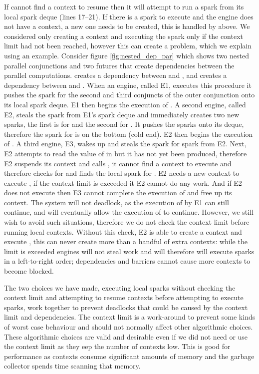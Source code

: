 If \idle cannot find a context to resume then it
will attempt to run a spark from its local spark deque (lines 17--21).
If there is a spark to execute and the engine does not have a context,
a new one needs to be created,
this is handled by \prepareengineforspark above.
We considered only creating a context and executing the spark only if the
context limit had not been reached,
however this can create a problem, which we explain using an example.
Consider figure \ref{fig:nested_dep_par} which shows two nested
parallel conjunctions
and
two futures that create dependencies between the parallel
computations.
 creates a dependency between  and ,
and  creates a dependency between  and .
When an engine, called E1,
executes this procedure it pushes the spark for the second and third
conjuncts of the outer conjunction onto its local spark deque.
E1 then begins the execution of .
A second engine, called E2,
steals the spark from E1's spark deque and immediately creates two new
sparks, the first is for  and the second for .
It pushes the sparks onto its deque,
therefore the spark for  is on the bottom (cold end).
E2 then begins the execution of .
A third engine, E3,
wakes up and steals the spark for  spark from E2.
Next,
E2 attempts to read the value of  in  but it has not yet
been produced,
therefore E2 suspends its context and calls \idle, it cannot find a context
to execute and therefore checks for and finds the local spark for .
E2 needs a new context to execute , if the context limit is exceeded
it E2 cannot do any work.
And if E2 does not execute  then E3 cannot complete the execution of
 and free up its context.
The system will not deadlock, as the execution of  by E1 can still
continue, and will eventually allow the execution of  to continue.
However, we still wish to avoid such situations,
therefore we do not check the context limit before running local contexts.
Without this check,
E2 is able to create a context and execute ,
this can never create more than a handful of extra contexts:
while the limit is exceeded engines will not steal work and will therefore
will execute sparks in a left-to-right order;
dependencies and barriers cannot cause more contexts to become blocked.

The two choices we have made,
executing local sparks without checking the context limit and
attempting to resume contexts before attempting to execute sparks,
work together to prevent deadlocks that could be caused by
the context limit and dependencies.
The context limit is a work-around to prevent some kinds of worst case
behaviour and should not normally affect other algorithmic choices.
These algorithmic choices are valid and desirable even if we did not need or
use the context limit as they eep the number of contexts low.
This is good for performance as contexts consume significant amounts of
memory and the garbage collector spends time scanning that memory.


